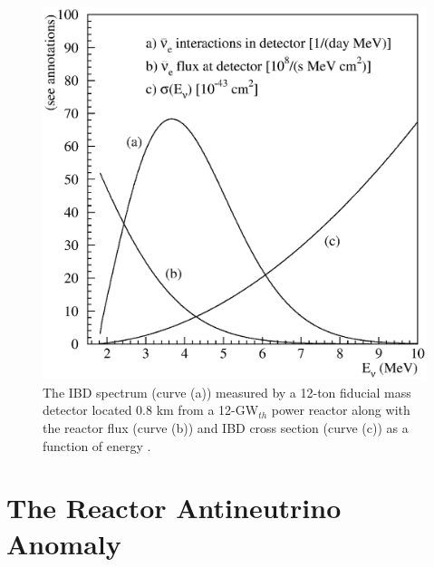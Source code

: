 \begin{figure}[h]
	\centering
	\includegraphics[width=0.7\linewidth]{tex/3-reactorneutrinos-images/vogel-fig02}
	\caption{The IBD spectrum (curve (a)) measured by a 12-ton fiducial mass detector located 0.8 km from a 12-GW$_{th}$ power reactor along with the reactor flux (curve (b)) and IBD cross section (curve (c)) as a function of energy \cite{PDG}.}
	\label{fig:vogel-fig02}
\end{figure}




\section{The Reactor Antineutrino Anomaly}






